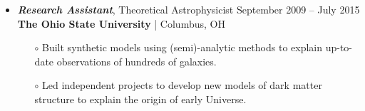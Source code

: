 \documentclass[10pt]{res}
\begin{document}
\begin{resume}
\begin{itemize} [leftmargin=0.0cm]
\begin{itemize}[leftmargin=0.35cm]
 \item[$\circ$] Developed \textbf{computer vision} tool and created pipeline in Python to visualize $\sim$1\,TB multidimensional data generated from simulations. Analyzed data using linear/polynomial regression, correlation and classification. 
 
 \item[$\circ$] \textbf{Optimized algorithms} to perform the most accurate simulations for astrophysical radiative systems, which can be observed by multi-wavelength ground and space telescopes.  
 
 \end{itemize}
 
 \vspace{0.1cm}
 
 
 \item 
{\sl  \textbf{Research Assistant}}, Theoretical Astrophysicist  \hfill September 2009 -- July 2015  \newline 
 \textbf{The Ohio State University} | Columbus, OH
 
  \begin{itemize} [leftmargin=0.35cm]
  \item[$\circ$] Built synthetic models using (semi)-analytic methods to explain up-to-date observations of hundreds of galaxies.
  \item[$\circ$] Led independent projects to develop new models of dark matter structure to explain the origin of early Universe.
  \end{itemize}
  
\end{itemize}
  
 



  

\end{resume}
\end{document}
